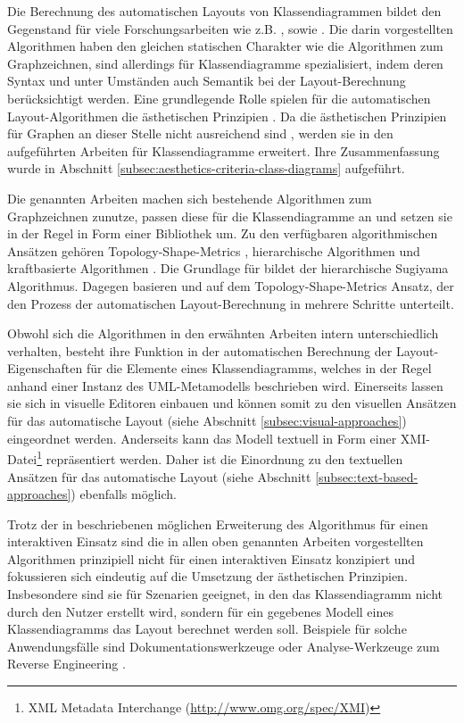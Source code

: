 Die Berechnung des automatischen Layouts von Klassendiagrammen bildet den Gegenstand für viele Forschungsarbeiten wie z.B. \cite{Eichelberger05Aesthetics}, \cite{Siebenhaller03Automatisches} sowie \cite{Eiglsperger04Automatic}. Die darin vorgestellten Algorithmen haben den gleichen statischen Charakter wie die Algorithmen zum Graphzeichnen, sind allerdings für Klassendiagramme spezialisiert, indem deren Syntax und unter Umständen auch Semantik bei der Layout-Berechnung berücksichtigt werden. Eine grundlegende Rolle spielen für die automatischen Layout-Algorithmen die ästhetischen Prinzipien \cite{Maier12A-Pattern-based}. Da die ästhetischen Prinzipien für Graphen an dieser Stelle nicht ausreichend sind \cite[S.79]{Eichelberger05Aesthetics}, werden sie in den aufgeführten Arbeiten für Klassendiagramme erweitert. Ihre Zusammenfassung wurde in Abschnitt \ref{subsec:aesthetics-criteria-class-diagrams} aufgeführt.

Die genannten Arbeiten machen sich bestehende Algorithmen zum Graphzeichnen zunutze, passen diese für die Klassendiagramme an und setzen sie in der Regel in Form einer Bibliothek um. Zu den verfügbaren algorithmischen Ansätzen gehören Topology-Shape-Metrics \cite[S.33]{Siebenhaller03Automatisches}, hierarchische Algorithmen und kraftbasierte Algorithmen \cite[S.32ff]{Eichelberger05Aesthetics}. Die Grundlage für \cite{Eichelberger05Aesthetics} bildet der hierarchische Sugiyama Algorithmus. Dagegen basieren \cite{Siebenhaller03Automatisches} und \cite{Eiglsperger04Automatic} auf dem Topology-Shape-Metrics Ansatz, der den Prozess der automatischen Layout-Berechnung in mehrere Schritte unterteilt.

Obwohl sich die Algorithmen in den erwähnten Arbeiten intern unterschiedlich verhalten, besteht ihre Funktion in der automatischen Berechnung der Layout-Eigenschaften für die Elemente eines Klassendiagramms, welches in der Regel anhand einer Instanz des UML-Metamodells beschrieben wird. Einerseits lassen sie sich in visuelle Editoren einbauen und können somit zu den visuellen Ansätzen für das automatische Layout (siehe Abschnitt \ref{subsec:visual-approaches}) eingeordnet werden. Anderseits kann das Modell textuell in Form einer XMI-Datei\footnote{XML Metadata Interchange (\url{http://www.omg.org/spec/XMI})} repräsentiert werden. Daher ist die Einordnung zu den textuellen Ansätzen für das automatische Layout (siehe Abschnitt \ref{subsec:text-based-approaches}) ebenfalls möglich.

Trotz der in \cite{Eiglsperger04Automatic} beschriebenen möglichen Erweiterung des Algorithmus für einen interaktiven Einsatz sind die in allen oben genannten Arbeiten vorgestellten Algorithmen prinzipiell nicht für einen interaktiven Einsatz konzipiert und fokussieren sich eindeutig auf die Umsetzung der ästhetischen Prinzipien. Insbesondere sind sie für Szenarien geeignet, in den das Klassendiagramm nicht durch den Nutzer erstellt wird, sondern für ein gegebenes Modell eines Klassendiagramms das Layout berechnet werden soll. Beispiele für solche Anwendungsfälle sind Dokumentationswerkzeuge oder Analyse-Werkzeuge zum Reverse Engineering \cite{Eiglsperger04Automatic}.

